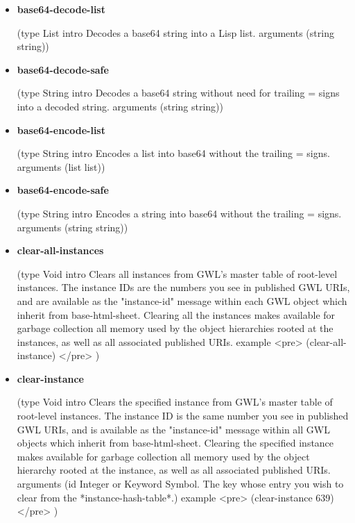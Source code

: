 \documentclass [11pt]{book}
\begin{document}
\begin{itemize}

\item {}
\label{prim:base64-decode-list}
\textbf{base64-decode-list}

(type List intro  Decodes a base64 string into a Lisp list.
 arguments (string string))



\item {}
\label{prim:base64-decode-safe}
\textbf{base64-decode-safe}

(type String intro
  Decodes a base64 string without need for trailing = signs into a decoded string.
 arguments (string string))



\item {}
\label{prim:base64-encode-list}
\textbf{base64-encode-list}

(type String intro
  Encodes a list into base64 without the trailing = signs.
 arguments (list list))



\item {}
\label{prim:base64-encode-safe}
\textbf{base64-encode-safe}

(type String intro
  Encodes a string into base64 without the trailing = signs.
 arguments (string string))



\item {}
\label{prim:clear-all-instances}
\textbf{clear-all-instances}

(type Void intro
  Clears all instances from GWL's master table of root-level instances.
The instance IDs are the numbers you see in published GWL URIs, and are available
as the "instance-id" message within each GWL object which inherit from base-html-sheet.
Clearing all the instances makes available for garbage collection all memory used by
the object hierarchies rooted at the instances, as well as all associated published URIs.
 example <pre> 
  (clear-all-instance)
</pre>
)



\item {}
\label{prim:clear-instance}
\textbf{clear-instance}

(type Void intro
  Clears the specified instance from GWL's master table of root-level instances.
The instance ID is the same number you see in published GWL URIs, and is available
as the "instance-id" message within all GWL objects which inherit from base-html-sheet.
Clearing the specified instance makes available for garbage collection all memory used by
the object hierarchy rooted at the instance, as well as all associated published URIs.
 arguments
 (id
  Integer or Keyword Symbol. The key whose entry you wish to clear from the *instance-hash-table*.)
 example <pre> 
  (clear-instance 639)
</pre>
)




\end{itemize}
\end{document}
